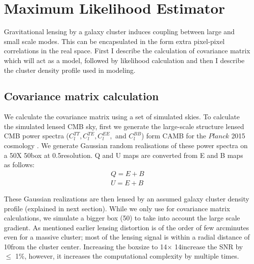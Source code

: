 \section{Maximum Likelihood Estimator}
\label{sec_MLE}
Gravitational lensing by a galaxy cluster induces coupling between large and small scale modes.
This can be encapsulated in the form extra pixel-pixel correlations in the real space. 
First I describe the calculation of covariance matrix which will act as a model, followed by likelihood calculation and then I describe the cluster density profile used in modeling. 


\subsection{Covariance matrix calculation}
\label{sec_covmat}

 We calculate the covariance matrix using a set of simulated skies. 
 To calculate the simulated lensed CMB sky, first we generate the large-scale structure lensed CMB power spectra ($C^{TT}_{l}, C^{TE}_{l}, C^{EE}_{l},$ and $C^{BB}_{l}$) form CAMB for the $Planck$ 2015 cosmology \citep{planck15-13}.  
 We generate Gaussian random realisations of these power spectra on a 50\am X 50\am box at 0.5\am resolution. 
 Q and U maps are converted from E and B maps as follows:
 \begin{eqnarray}
Q = E + B\\
U = E + B
 \label{eq:coord_trans}
 \end{eqnarray}
 
 These Gaussian realizations are then lensed by an assumed galaxy cluster density profile (explained in next section). 
 While we only use  \smallboxsize  for covariance matrix calculations, we simulate a bigger box (50\am) to take into account the large scale gradient.
 As mentioned earlier lensing distortion is of the order of few arcminutes even for a massive cluster; most of the lensing signal is within a radial distance of  10\am from the cluster center.
Increasing the boxsize to 14\am $\times$ 14\am increase the SNR by $\le$ 1\%, however, it increases the computational complexity by multiple times.

